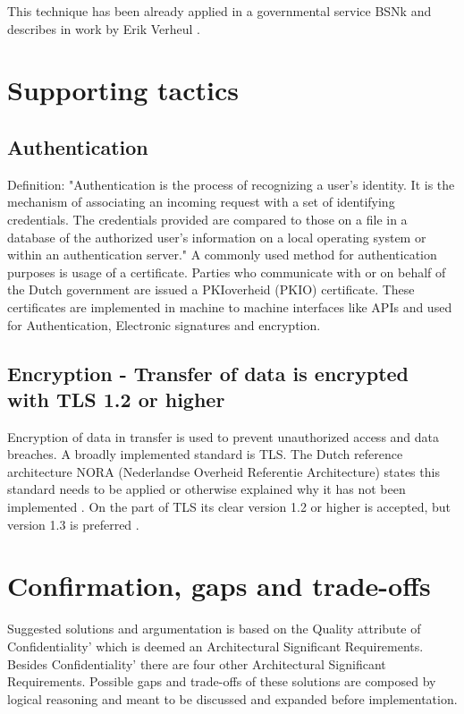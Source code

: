 This technique has been already applied in a governmental service BSNk \cite{Logius_BSNk} and describes in work by Erik Verheul \cite{VerheuleID}.

\section{Supporting tactics}

\subsection{Authentication} \label{authentication}
Definition: "Authentication is the process of recognizing a user’s identity. It is the mechanism of associating an incoming request with a set of identifying credentials. The credentials provided are compared to those on a file in a database of the authorized user’s information on a local operating system or within an authentication server." \cite{authentication}
A commonly used method for authentication purposes is usage of a certificate. Parties who communicate with or on behalf of the Dutch government are issued a PKIoverheid (PKIO) certificate. These certificates are implemented in machine to machine interfaces like APIs and used for Authentication, Electronic signatures and encryption. \cite{Logius_PKIO}

\subsection{Encryption - Transfer of data is encrypted with TLS 1.2 or higher} \label{encryption}
Encryption of data in transfer is used to prevent unauthorized access and data breaches. A broadly implemented standard is TLS. The Dutch reference architecture NORA (Nederlandse Overheid Referentie Architecture) \cite{NORA} states this standard needs to be applied or otherwise explained why it has not been implemented \cite{NORA_PasToeOfLegUit}. On the part of TLS its clear version 1.2 or higher is accepted, but version 1.3 is preferred \cite{NORA_TLS}. 

\section{Confirmation, gaps and trade-offs}
Suggested solutions and argumentation is based on the Quality attribute of Confidentiality' which is deemed an Architectural Significant Requirements. Besides Confidentiality' there are four other Architectural Significant Requirements. Possible gaps and trade-offs of these solutions are composed by logical reasoning and meant to be discussed and expanded before implementation.

